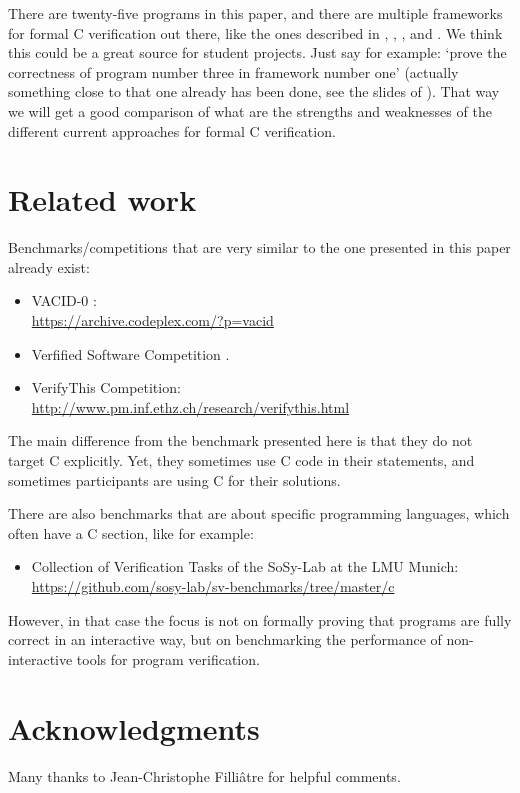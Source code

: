\documentclass{article}
\begin{document}
There are twenty-five programs in this paper, and there are multiple
frameworks for formal C verification out there, like the ones described
in \cite{app:11}, \cite{cor:cuo:kir:mar:pre:puc:sig:yak:18}, \cite{dah:mos:san:tob:sch:09}, \cite{gre:and:klei:12} and \cite{jac:sma:phi:vog:pen:pie:11}.
We think this could be a great source for student projects.
Just say for example: `prove the correctness of program number three in framework
number one' (actually something close to that one already has been done, see the slides of \cite{wie:16:1}).
That way we will get a good comparison of what are the strengths and
weaknesses of the different current approaches for formal C verification.

\section{Related work}

Benchmarks/competitions that are very similar to the one presented in this paper
already exist:
\begin{itemize}
\item
VACID-0 \cite{lei:mos:10}: \\
\url{https://archive.codeplex.com/?p=vacid}

\item
Verfified Software Competition \cite{fil:pas:stu:12,kle:mul:sha:lea:wus:alk:art:bro:cha:coh:hil:jac:lei:mon:pie:pol:rid:sma:tob:tue:ulb:wei:11}. %

\item
VerifyThis Competition: \\
\url{http://www.pm.inf.ethz.ch/research/verifythis.html}

\end{itemize}
The main difference from the benchmark
presented here is that they do not target C explicitly.
Yet, they sometimes use C code in their statements, and sometimes
participants are using C for their solutions.

There are also benchmarks that are about specific programming languages,
which often have a C section, like for example:
\begin{itemize}
\item
Collection of Verification Tasks of the SoSy-Lab at the LMU Munich: \\
\url{https://github.com/sosy-lab/sv-benchmarks/tree/master/c}

\end{itemize}
However, in that case the focus is not on formally proving that programs
are fully correct in an interactive way, but on benchmarking the performance of non-interactive tools for program verification.

\section*{Acknowledgments}
Many thanks to Jean-Christophe Filli\^atre for helpful comments.



\end{document}

